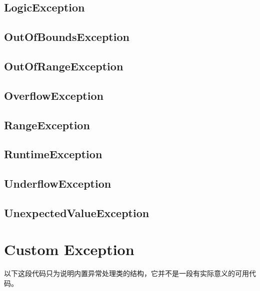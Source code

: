\subsection{LogicException}


\subsection{OutOfBoundsException}


\subsection{OutOfRangeException}


\subsection{OverflowException}


\subsection{RangeException}


\subsection{RuntimeException}


\subsection{UnderflowException}


\subsection{UnexpectedValueException}


















\section{Custom Exception}

以下这段代码只为说明内置异常处理类的结构，它并不是一段有实际意义的可用代码。

